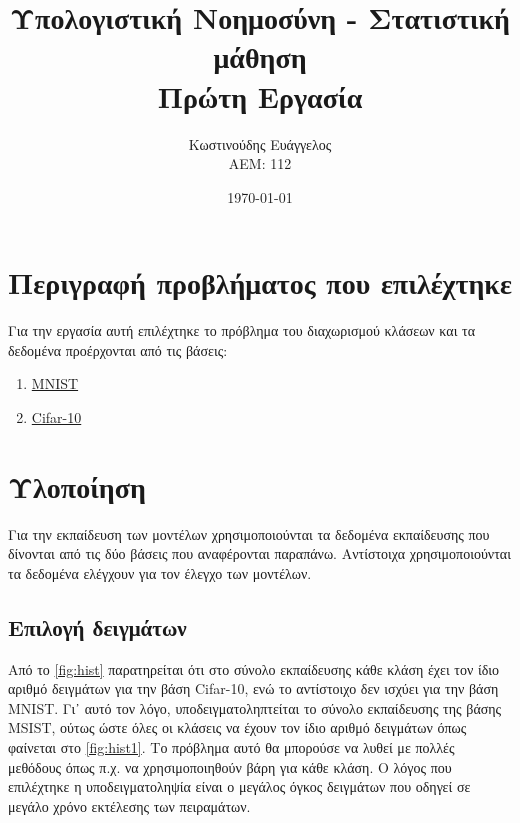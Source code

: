 \documentclass[a4paper]{article}
\title{Υπολογιστική Νοημοσύνη - Στατιστική μάθηση \\ Πρώτη Εργασία}
\author{Κωστινούδης Ευάγγελος \\ΑΕΜ: 112}
\date{\today}
\begin{document}
\maketitle
{}
\newpage
{}

\section{Περιγραφή προβλήματος που επιλέχτηκε}

Για την εργασία αυτή επιλέχτηκε το πρόβλημα του διαχωρισμού κλάσεων και τα
δεδομένα προέρχονται από τις βάσεις:

\begin{enumerate}
\item \href{http://yann.lecun.com/exdb/mnist/}{MNIST}
\item \href{https://www.cs.toronto.edu/~kriz/cifar.html}{Cifar-10}
\end{enumerate}


\section{Υλοποίηση}

Για την εκπαίδευση των μοντέλων χρησιμοποιούνται τα δεδομένα εκπαίδευσης που
δίνονται από τις δύο βάσεις που αναφέρονται παραπάνω. Αντίστοιχα
χρησιμοποιούνται τα δεδομένα ελέγχουν για τον έλεγχο των μοντέλων.

\subsection{Επιλογή δειγμάτων}

Από το \autoref{fig:hist} παρατηρείται ότι στο σύνολο εκπαίδευσης κάθε κλάση έχει
τον ίδιο αριθμό δειγμάτων για την βάση Cifar-10, ενώ το αντίστοιχο δεν ισχύει
για την βάση MNIST. Γι᾽ αυτό τον λόγο, υποδειγματοληπτείται το σύνολο
εκπαίδευσης της βάσης MSIST, ούτως ώστε όλες οι κλάσεις να έχουν τον ίδιο αριθμό
δειγμάτων όπως φαίνεται στο \autoref{fig:hist1}. Το πρόβλημα αυτό θα μπορούσε να
λυθεί με πολλές μεθόδους όπως π.χ. να χρησιμοποιηθούν βάρη για κάθε κλάση. Ο
λόγος που επιλέχτηκε η υποδειγματοληψία είναι ο μεγάλος όγκος δειγμάτων που
οδηγεί σε μεγάλο χρόνο εκτέλεσης των πειραμάτων.
\end{document}
